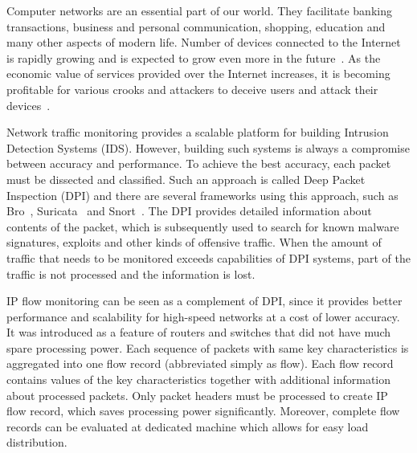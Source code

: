 
Computer networks are an essential part of our world. They facilitate banking transactions, business and personal communication, shopping, education and many other aspects of modern life. Number of devices connected to the Internet is rapidly growing and is expected to grow even more in the future~\cite{number-of-attacks}. As the economic value of services provided over the Internet increases, it is becoming profitable for various crooks and attackers to deceive users and attack their devices~\cite{cybercrime-costs}.


Network traffic monitoring provides a scalable platform for building Intrusion Detection Systems (IDS). However, building such systems is always a compromise between accuracy and performance. To achieve the best accuracy, each packet must be dissected and classified. Such an approach is called Deep Packet Inspection (DPI) and there are several frameworks using this approach, such as Bro~\cite{Paxson:1999:BSD:337967.337972}, Suricata~\cite{suricata} and Snort~\cite{snort}. The DPI provides detailed information about contents of the packet, which is subsequently used to search for known malware signatures, exploits and other kinds of offensive traffic. When the amount of traffic that needs to be monitored exceeds capabilities of DPI systems, part of the traffic is not processed and the information is lost. 

IP flow monitoring can be seen as a complement of DPI, since it provides better performance and scalability for high-speed networks at a cost of lower accuracy. It was introduced as a feature of routers and switches that did not have much spare processing power. Each sequence of packets with same key characteristics is aggregated into one flow record (abbreviated simply as flow). Each flow record contains values of the key characteristics together with additional information about processed packets. Only packet headers must be processed to create IP flow record, which saves processing power significantly. Moreover, complete flow records can be evaluated at dedicated machine which allows for easy load distribution.

